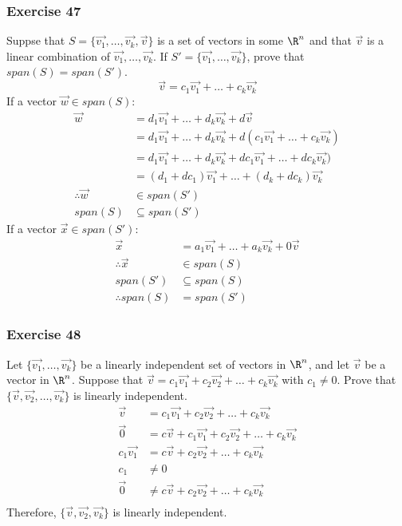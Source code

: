 \documentclass{math}
\begin{document}
\subsubsection*{Exercise 47}
Suppse that \( S = \{\vec{v_1},\dots,\vec{v_k},\vec{v}\} \) is a set of vectors
in some \( \R^n \) and that \( \vec{v} \) is a linear combination of
\( \vec{v_1},\dots,\vec{v_k} \). If \( S' = \{\vec{v_1},\dots,\vec{v_k}\} \),
prove that \( span(S) = span(S') \).
\[ \vec{v} = c_1\vec{v_1}+\dots+c_k\vec{v_k} \]
If a vector \( \vec{w}\in span(S) \):
\begin{align*}
  \vec{w} &= d_1\vec{v_1}+\dots+d_k\vec{v_k}+d\vec{v} \\
  &= d_1\vec{v_1}+\dots+d_k\vec{v_k}+d(c_1\vec{v_1}+\dots+c_k\vec{v_k}) \\
  &= d_1\vec{v_1}+\dots+d_k\vec{v_k}+dc_1\vec{v_1}+\dots+dc_k\vec{v_k}) \\
  &= (d_1+dc_1)\vec{v_1}+\dots+(d_k+dc_k)\vec{v_k} \\
  \therefore \vec{w} &\in span(S') \\
  span(S) &\subseteq span(S')
\end{align*}
If a vector \( \vec{x}\in span(S') \):
\begin{align*}
  \vec{x} &= a_1\vec{v_1}+\dots+a_k\vec{v_k}+0\vec{v} \\
  \therefore \vec{x}&\in span(S) \\
  span(S') &\subseteq span(S) \\
  \therefore span(S) &= span(S')
\end{align*}

\subsubsection*{Exercise 48}
Let \( \{\vec{v_1},\dots,\vec{v_k}\} \) be a linearly independent set of vectors
in \( \R^n \), and let \( \vec{v} \) be a vector in \( \R^n \). Suppose that
\( \vec{v} = c_1\vec{v_1}+c_2\vec{v_2}+\dots+c_k\vec{v_k} \) with \( c_1 \ne 0
\). Prove that \( \{\vec{v},\vec{v_2},\dots,\vec{v_k}\} \) is linearly
independent.
\begin{align*}
  \vec{v} &= c_1\vec{v_1}+c_2\vec{v_2}+\dots+c_k\vec{v_k} \\
  \vec{0} &= c\vec{v}+c_1\vec{v_1}+c_2\vec{v_2}+\dots+c_k\vec{v_k} \\
  c_1\vec{v_1} &= c\vec{v}+c_2\vec{v_2}+\dots+c_k\vec{v_k} \\
  c_1 &\ne 0 \\
  \vec{0} &\ne c\vec{v}+c_2\vec{v_2}+\dots+c_k\vec{v_k} \\
\end{align*}
Therefore, \( \{\vec{v},\vec{v_2},\vec{v_k}\} \) is linearly independent.
\end{document}
